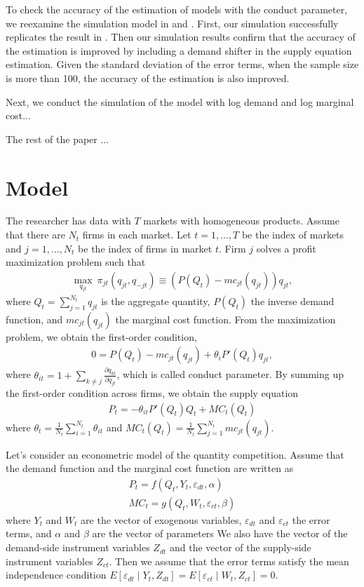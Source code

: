 \documentclass[11pt, a4paper]{article}
\begin{document}
To check the accuracy of the estimation of models with the conduct parameter, we reexamine the simulation model in \cite{perloff2012collinearity} and \cite{perloff2012collinearity}.
First, our simulation successfully replicates the result in \cite{perloff2012collinearity}.
Then our simulation results confirm that the accuracy of the estimation is improved by including a demand shifter in the supply equation estimation.
Given the standard deviation of the error terms, when the sample size is more than 100, the accuracy of the estimation is also improved.

Next, we conduct the simulation of the model with log demand and log marginal cost...


The rest of the paper ...



\section{Model}
The researcher has data with $T$ markets with homogeneous products.
Assume that there are $N_t$ firms in each market.
Let $t = 1,\ldots, T$ be the index of markets and $j = 1, \ldots, N_t$ be the index of firms in market $t$.
Firm $j$ solves a profit maximization problem such that
\begin{align}
    \max_{q_{jt}} \ \pi_{jt}(q_{jt}, q_{-jt}) \equiv (P(Q_t) - mc_{jt}(q_{jt}))q_{jt},
\end{align}
where $Q_t = \sum_{j = 1}^{N_t} q_{jt}$ is the aggregate quantity, $P(Q_t)$ the inverse demand function, and $mc_{jt}(q_{jt})$ the marginal cost function.
From the maximization problem, we obtain the first-order condition,
\begin{align}
    0 = P(Q_{t}) - mc_{jt}(q_{jt}) + \theta_i P'(Q_{t})q_{jt},
\end{align}
where $\theta_{it} = 1 + \sum_{k\ne j}\frac{\partial q_{kt}}{\partial q_{jt}}$, which is called conduct parameter.
By summing up the first-order condition across firms, we obtain the supply equation 
\begin{align}
     P_t = -\theta_{it}P'(Q_{t})Q_t + MC_t(Q_t)
\end{align}
where $\theta_t = \frac{1}{N_t}\sum_{i = 1}^{N_t}\theta_{it}$ and $MC_t(Q_t) = \frac{1}{N_t}\sum_{j = 1}^{N_t} mc_{jt}(q_{jt})$.

Let's consider an econometric model of the quantity competition.
Assume that the demand function and the marginal cost function are written as 
\begin{align}
    P_t = f(Q_t, Y_t, \varepsilon_{dt}, \alpha)\\
    MC_t = g(Q_t, W_t, \varepsilon_{ct}, \beta)
\end{align}
where $Y_t$ and $W_t$ are the vector of exogenous variables, $\varepsilon_{dt}$ and $\varepsilon_{ct}$ the error terms, and $\alpha$ and $\beta$ are the vector of parameters
We also have the vector of the demand-side instrument variables $Z_{dt}$ and the vector of the supply-side instrument variables $Z_{ct}$.
Then we assume that the error terms satisfy the mean independence condition $E[\varepsilon_{dt}\mid Y_t, Z_{dt}] = E[\varepsilon_{ct} \mid W_t, Z_{ct}] =0$.
\end{document}
